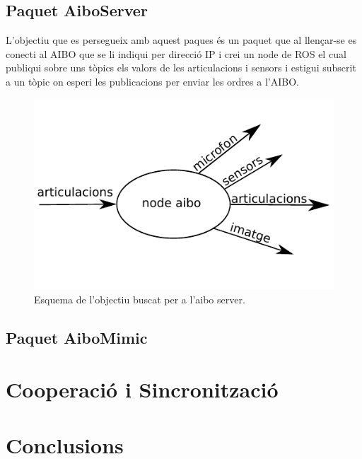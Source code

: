 \documentclass[12pt,a4paper,final,twoside]{article}
\begin{document}
\subsection{Paquet AiboServer }
L'objectiu que es persegueix amb aquest paques és un paquet que al llençar-se es conecti al AIBO que se li indiqui per direcció IP i crei un node de ROS el cual publiqui sobre uns tòpics els valors de les articulacions i sensors i estigui subscrit a un tòpic on esperi les publicacions per enviar les ordres a l'AIBO.

\begin{figure}[H]
	\centering
    \includegraphics[scale=1]{images/aiboserver.pdf}
	 \caption{Esquema de l'objectiu buscat per a l'aibo server.}
  \label{fig:aiboserv}
\end{figure}


\subsection{Paquet AiboMimic}
\section{Cooperació i Sincronització}
\section*{Conclusions}
\end{document}
